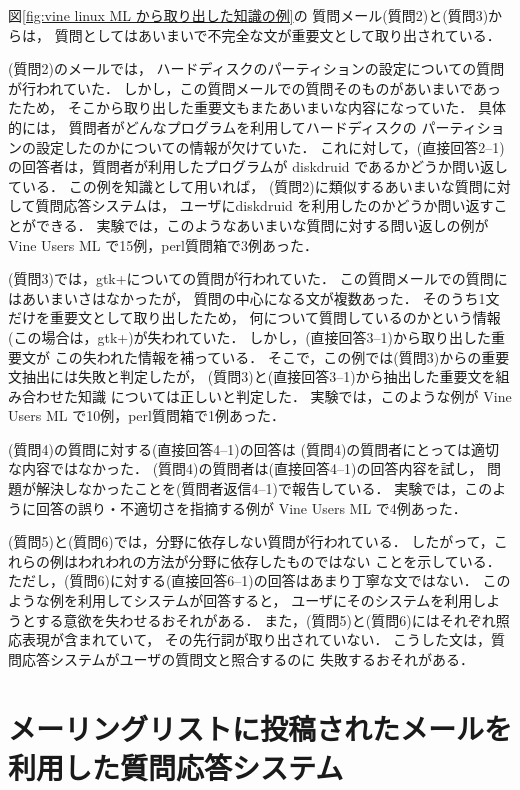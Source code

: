 図\ref{fig:vine linux ML から取り出した知識の例}の
質問メール(質問2)と(質問3)からは，
質問としてはあいまいで不完全な文が重要文として取り出されている．


(質問2)のメールでは，
ハードディスクのパーティションの設定についての質問が行われていた．
しかし，この質問メールでの質問そのものがあいまいであったため，
そこから取り出した重要文もまたあいまいな内容になっていた．
具体的には，
質問者がどんなプログラムを利用してハードディスクの
パーティションの設定したのかについての情報が欠けていた．
これに対して，(直接回答2--1)の回答者は，質問者が利用したプログラムが
diskdruid であるかどうか問い返している．
この例を知識として用いれば，
(質問2)に類似するあいまいな質問に対して質問応答システムは，
ユーザにdiskdruid を利用したのかどうか問い返すことができる．
実験では，このようなあいまいな質問に対する問い返しの例が
Vine Users ML で15例，perl質問箱で3例あった．

(質問3)では，gtk+についての質問が行われていた．
この質問メールでの質問にはあいまいさはなかったが，
質問の中心になる文が複数あった．
そのうち1文だけを重要文として取り出したため，
何について質問しているのかという情報(この場合は，gtk+)が失われていた．
しかし，(直接回答3--1)から取り出した重要文が
この失われた情報を補っている．
そこで，この例では(質問3)からの重要文抽出には失敗と判定したが，
(質問3)と(直接回答3--1)から抽出した重要文を組み合わせた知識
については正しいと判定した．
実験では，このような例が
Vine Users ML で10例，perl質問箱で1例あった．


(質問4)の質問に対する(直接回答4--1)の回答は
(質問4)の質問者にとっては適切な内容ではなかった．
(質問4)の質問者は(直接回答4--1)の回答内容を試し，
問題が解決しなかったことを(質問者返信4--1)で報告している．
実験では，このように回答の誤り・不適切さを指摘する例が
Vine Users ML で4例あった．


(質問5)と(質問6)では，分野に依存しない質問が行われている．
したがって，これらの例はわれわれの方法が分野に依存したものではない
ことを示している．
ただし，(質問6)に対する(直接回答6--1)の回答はあまり丁寧な文ではない．
このような例を利用してシステムが回答すると，
ユーザにそのシステムを利用しようとする意欲を失わせるおそれがある．
また，(質問5)と(質問6)にはそれぞれ照応表現が含まれていて，
その先行詞が取り出されていない．
こうした文は，質問応答システムがユーザの質問文と照合するのに
失敗するおそれがある．



 \section{メーリングリストに投稿されたメールを利用した質問応答システム}
 \label{sec:メーリングリストに投稿されたメールを利用した質問応答システム}

